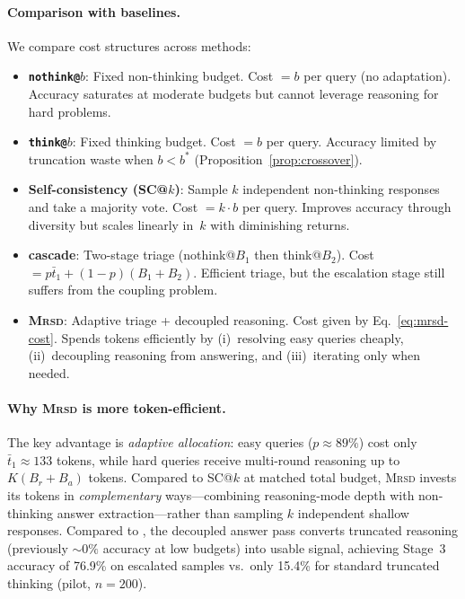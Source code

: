 \paragraph{Comparison with baselines.}
We compare cost structures across methods:
\begin{itemize}[nosep,leftmargin=*]
  \item \textbf{\texttt{nothink@$b$}}: Fixed non-thinking budget.
    Cost $= b$ per query (no adaptation).
    Accuracy saturates at moderate budgets but cannot leverage reasoning
    for hard problems.
  \item \textbf{\texttt{think@$b$}}: Fixed thinking budget.
    Cost $= b$ per query.
    Accuracy limited by truncation waste when $b < b^*$
    (Proposition~\ref{prop:crossover}).
  \item \textbf{Self-consistency (SC@$k$)}: Sample $k$ independent
    non-thinking responses and take a majority vote.
    Cost $= k \cdot b$ per query.
    Improves accuracy through diversity but scales linearly in~$k$
    with diminishing returns.
  \item \textbf{\town{} cascade}: Two-stage triage (nothink@$B_1$ then
    think@$B_2$).
    Cost $= p \bar{t}_1 + (1-p)(B_1 + B_2)$.
    Efficient triage, but the escalation stage still suffers from the
    coupling problem.
  \item \textbf{\textsc{Mrsd}}: Adaptive triage + decoupled reasoning.
    Cost given by Eq.~\eqref{eq:mrsd-cost}.
    Spends tokens efficiently by (i)~resolving easy queries cheaply,
    (ii)~decoupling reasoning from answering, and (iii)~iterating only
    when needed.
\end{itemize}

\paragraph{Why \textsc{Mrsd} is more token-efficient.}
The key advantage is \emph{adaptive allocation}: easy queries ($p \approx 89\%$)
cost only $\bar{t}_1 \approx 133$ tokens, while hard queries receive
multi-round reasoning up to $K(B_r + B_a)$ tokens.
Compared to SC@$k$ at matched total budget, \textsc{Mrsd} invests
its tokens in \emph{complementary} ways---combining reasoning-mode
depth with non-thinking answer extraction---rather than sampling
$k$ independent shallow responses.
Compared to \town{}, the decoupled answer pass converts truncated
reasoning (previously ${\sim}0\%$ accuracy at low budgets) into usable
signal, achieving Stage~3 accuracy of 76.9\% on escalated samples
vs.\ only 15.4\% for standard truncated thinking
(pilot, $n{=}200$).

